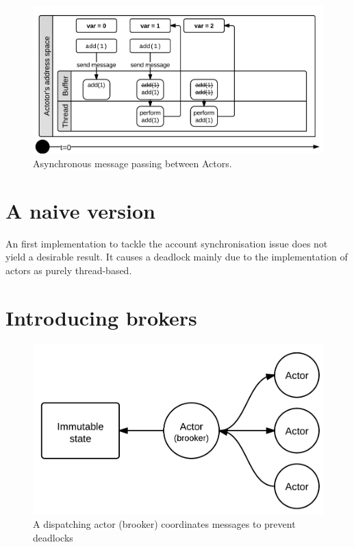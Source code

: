\documentclass[a4paper,12pt]{kth-mag}
\begin{document}
\begin{figure}[H]
    \begin{center}
    \includegraphics{images/ActorsAdd.png}
    \end{center}
    \caption{Asynchronous message passing between Actors.}
    \label{fig:actorsAdd}
\end{figure}

\section{A naive version}
An first implementation to tackle the account synchronisation issue does not yield a desirable result. It causes a deadlock mainly due to the implementation of actors as purely thread-based.

\section{Introducing brokers}

\begin{figure}[H]
    \begin{center}
    \includegraphics{images/ActorsBrooker.png}
    \end{center}
    \caption{A dispatching actor (brooker) coordinates messages to prevent deadlocks}
    \label{fig:actorsBrooker}
\end{figure}
\end{document}
